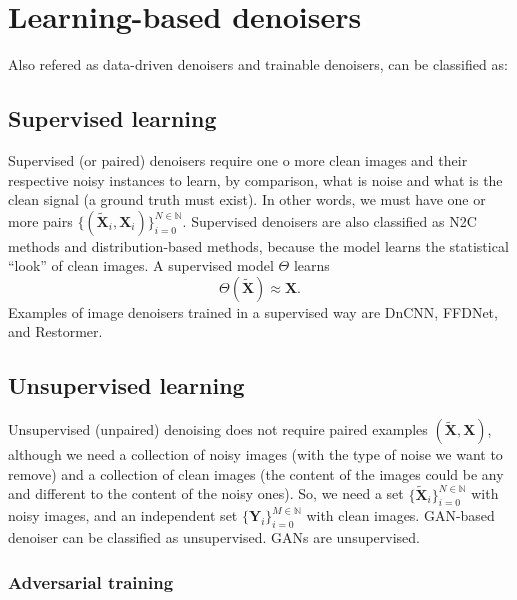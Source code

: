 \chapter{Learning-based denoisers}

Also refered as data-driven denoisers and trainable denoisers, can be
classified as:

\section{Supervised learning}

Supervised (or paired) denoisers require one o more clean images
  and their respective noisy instances to learn, by comparison, what
  is noise and what is the clean signal (a ground truth must
  exist). In other words, we must have one or more pairs
  $\{(\tilde{\bm{X}}_i,\bm{X}_i)\}_{i=0}^{N\in\mathbb{N}}$. Supervised
  denoisers are also classified as \gls{N2C} methods and
  distribution-based methods, because the model learns the statistical
  ``look'' of clean images. A supervised model $\Theta$ learns
  \begin{equation}
    \Theta(\tilde{\bm{X}}) \approx \bm{X}.
  \end{equation}
  Examples of image denoisers trained in a supervised way are DnCNN,
  FFDNet, and Restormer.

\section{Unsupervised learning}
Unsupervised (unpaired) denoising does not require paired
  examples $(\tilde{\bm{X}},\bm{X})$, although we need a collection of
  noisy images (with the type of noise we want to remove) and a
  collection of clean images (the content of the images could be any
  and different to the content of the noisy ones). So, we need a set
  $\{\tilde{\bm{X}}_i\}_{i=0}^{N\in\mathbb{N}}$ with noisy images, and
  an independent set $\{\bm{Y}_i\}_{i=0}^{M\in\mathbb{N}}$ with clean
  images. GAN-based denoiser can be classified as unsupervised. GANs
  are unsupervised.

\subsection{Adversarial training}

